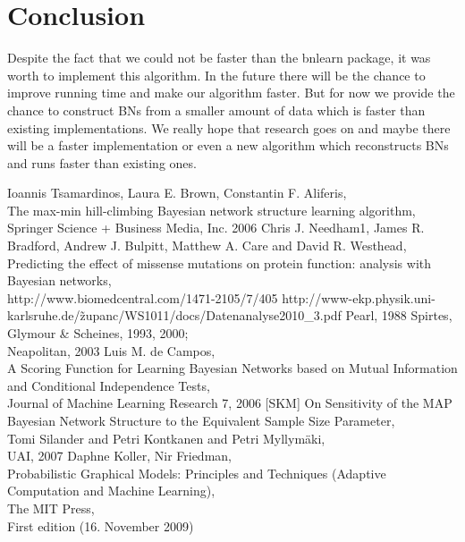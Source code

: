 \chapter{Conclusion}

	Despite the fact that we could not be faster than the bnlearn package, it was worth to implement this algorithm. In the future there will be the chance to improve running time and make our algorithm faster. But for now we provide the chance to construct BNs from a smaller amount of data which is faster than existing implementations. We really hope that research goes on and maybe there will be a faster implementation or even a new algorithm which reconstructs BNs and runs faster than existing ones.


\begin{thebibliography}{56}

Ioannis Tsamardinos, Laura E. Brown, Constantin F. Aliferis,\\
The max-min hill-climbing Bayesian network structure learning algorithm,\\
Springer Science + Business Media,
Inc. 2006
Chris J. Needham1, James R. Bradford, Andrew J. Bulpitt, Matthew A. Care and David R. Westhead,\\
Predicting the effect of missense mutations on protein function: analysis with Bayesian networks,\\
http://www.biomedcentral.com/1471-2105/7/405
http://www-ekp.physik.uni-karlsruhe.de/\~zupanc/WS1011/docs/Datenanalyse2010\_3.pdf
Pearl,
1988
Spirtes, Glymour \& Scheines,
1993, 2000; \\
Neapolitan,
2003
Luis M. de Campos,\\
A Scoring Function for Learning Bayesian Networks based on Mutual
Information and Conditional Independence Tests,\\
Journal of Machine Learning Research 7, 2006
[SKM]
On Sensitivity of the MAP Bayesian Network Structure to the Equivalent Sample Size Parameter,\\
Tomi Silander and Petri Kontkanen and Petri Myllymäki,\\
UAI, 2007
Daphne Koller, Nir Friedman,\\
Probabilistic Graphical Models: Principles and Techniques (Adaptive Computation and Machine Learning),\\
The MIT Press,\\
First edition (16. November 2009)

\end{thebibliography}




